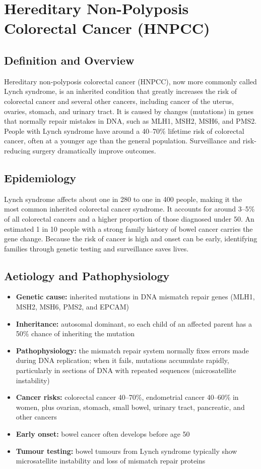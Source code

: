 \chapter{Hereditary Non-Polyposis Colorectal Cancer (HNPCC)}

\section*{Definition and Overview}
Hereditary non-polyposis colorectal cancer (HNPCC), now more commonly called Lynch syndrome, is an inherited condition that greatly increases the risk of colorectal cancer and several other cancers, including cancer of the uterus, ovaries, stomach, and urinary tract. It is caused by changes (mutations) in genes that normally repair mistakes in DNA, such as MLH1, MSH2, MSH6, and PMS2. People with Lynch syndrome have around a 40--70\% lifetime risk of colorectal cancer, often at a younger age than the general population. Surveillance and risk-reducing surgery dramatically improve outcomes.

\section*{Epidemiology}
Lynch syndrome affects about one in 280 to one in 400 people, making it the most common inherited colorectal cancer syndrome. It accounts for around 3--5\% of all colorectal cancers and a higher proportion of those diagnosed under 50. An estimated 1 in 10 people with a strong family history of bowel cancer carries the gene change. Because the risk of cancer is high and onset can be early, identifying families through genetic testing and surveillance saves lives.

\section*{Aetiology and Pathophysiology}
\begin{itemize}
    \item \textbf{Genetic cause:} inherited mutations in DNA mismatch repair genes (MLH1, MSH2, MSH6, PMS2, and EPCAM)
    \item \textbf{Inheritance:} autosomal dominant, so each child of an affected parent has a 50\% chance of inheriting the mutation
    \item \textbf{Pathophysiology:} the mismatch repair system normally fixes errors made during DNA replication; when it fails, mutations accumulate rapidly, particularly in sections of DNA with repeated sequences (microsatellite instability)
    \item \textbf{Cancer risks:} colorectal cancer 40--70\%, endometrial cancer 40--60\% in women, plus ovarian, stomach, small bowel, urinary tract, pancreatic, and other cancers
    \item \textbf{Early onset:} bowel cancer often develops before age 50
    \item \textbf{Tumour testing:} bowel tumours from Lynch syndrome typically show microsatellite instability and loss of mismatch repair proteins
\end{itemize}

